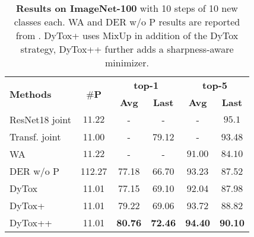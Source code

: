 \begin{table}[t]
    \centering
    \begin{tabular}{l|ccccc}
        \hline
        \multirow{2}{*}{\textbf{Methods}}                & \multirow{2}{*}{\textbf{$\#$P}} & \multicolumn{2}{c}{\textbf{top-1}} & \multicolumn{2}{c}{\textbf{top-5}}                                   \\
                                                         &                                 & \textbf{Avg}                       & \textbf{Last}                      & \textbf{Avg}   & \textbf{Last}  \\
        \hline
        ResNet18 joint                                   & $11.22$                         & -                                  & -                                  & -              & $95.1$         \\
        Transf. joint                                    & 11.00                           & -                                  & 79.12                              & -              & 93.48          \\
        \hline
        WA \scriptsize{\citep{zhao2020weightalignement}} & $11.22$                         & -                                  & -                                  & $91.00$        & $84.10$        \\
        DER w/o P \scriptsize{\citep{yan2021der}}        & 112.27                          & 77.18                              & 66.70                              & 93.23          & 87.52          \\
        \hline
        DyTox                                            & 11.01                           & 77.15                              & 69.10                              & 92.04          & 87.98          \\
        DyTox+                                           & 11.01                           & 79.22                              & 69.06                              & 93.72          & 88.82          \\
        DyTox++                                          & 11.01                           & \textbf{80.76}                     & \textbf{72.46}                     & \textbf{94.40} & \textbf{90.10} \\
        \hline
    \end{tabular}
    \caption{\textbf{Results on ImageNet-100} with 10 steps of 10 new classes each. WA and DER w/o P
        results are reported from \cite{yan2021der}. DyTox+ uses MixUp in addition of the DyTox
        strategy, DyTox++ further adds a sharpness-aware minimizer.}
    \label{tab:dytox_imagenet_pp}
\end{table}
